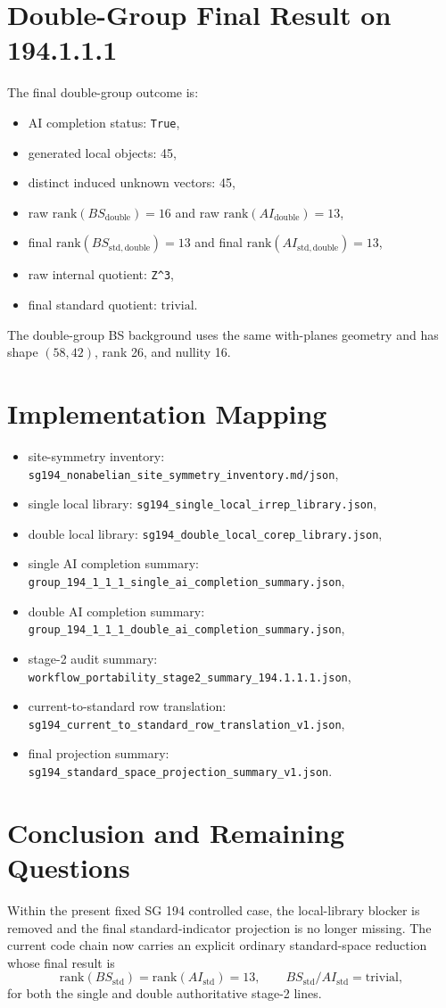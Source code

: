\documentclass[11pt]{article}
\begin{document}
\section{Double-Group Final Result on 194.1.1.1}
The final double-group outcome is:
\begin{itemize}
\item AI completion status: \texttt{True},
\item generated local objects: 45,
\item distinct induced unknown vectors: 45,
\item raw $\mathrm{rank}(BS_{\mathrm{double}}) = 16$ and raw $\mathrm{rank}(AI_{\mathrm{double}}) = 13$,
\item final $\mathrm{rank}(BS_{\mathrm{std,double}}) = 13$ and final $\mathrm{rank}(AI_{\mathrm{std,double}}) = 13$,
\item raw internal quotient: \texttt{Z\textasciicircum{}3},
\item final standard quotient: $\mathrm{trivial}$.
\end{itemize}
The double-group BS background uses the same with-planes geometry and has shape $(58,42)$, rank 26, and nullity 16.

\section{Implementation Mapping}
\begin{itemize}
\item site-symmetry inventory: \texttt{sg194\_nonabelian\_site\_symmetry\_inventory.md/json},
\item single local library: \texttt{sg194\_single\_local\_irrep\_library.json},
\item double local library: \texttt{sg194\_double\_local\_corep\_library.json},
\item single AI completion summary: \texttt{group\_194\_1\_1\_1\_single\_ai\_completion\_summary.json},
\item double AI completion summary: \texttt{group\_194\_1\_1\_1\_double\_ai\_completion\_summary.json},
\item stage-2 audit summary: \texttt{workflow\_portability\_stage2\_summary\_194.1.1.1.json},
\item current-to-standard row translation: \texttt{sg194\_current\_to\_standard\_row\_translation\_v1.json},
\item final projection summary: \texttt{sg194\_standard\_space\_projection\_summary\_v1.json}.
\end{itemize}

\section{Conclusion and Remaining Questions}
Within the present fixed SG 194 controlled case, the local-library blocker is removed and the final standard-indicator projection is no longer missing. The current code chain now carries an explicit ordinary standard-space reduction whose final result is
\[
\mathrm{rank}(BS_{\mathrm{std}}) = \mathrm{rank}(AI_{\mathrm{std}}) = 13,
\qquad
BS_{\mathrm{std}}/AI_{\mathrm{std}} = \mathrm{trivial},
\]
for both the single and double authoritative stage-2 lines.
\end{document}
